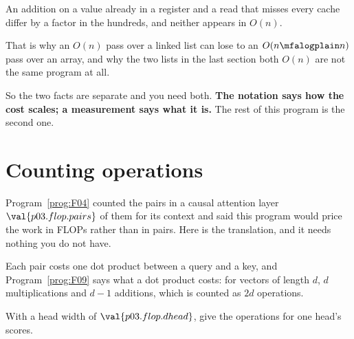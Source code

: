 \begin{fr}

An addition on a value already in a register and a read that misses every
cache differ by a factor in the hundreds, and neither appears in $O(n)$.

That is why an $O(n)$ pass over a linked list can lose to an
$O(n \mfalogplain n)$ pass over an array, and why the two lists in the last
section \dash{} both $O(n)$ \dash{} are not the same program at all.

\medskip
\noindent
So the two facts are separate and you need both. \textbf{The notation says how
the cost scales; a measurement says what it is.} The rest of this program is
the second one.
\end{fr}

\section{Counting operations}
\label{sec:P03-flops}

\begin{fr}
Program~\ref{prog:F04} counted the pairs in a causal attention layer \dash{}
$\val{p03.flop.pairs}$ of them for its context \dash{} and said this program
would price the work in FLOPs rather than in pairs. Here is the translation,
and it needs nothing you do not have.

Each pair costs one dot product between a query and a key, and
Program~\ref{prog:F09} says what a dot product costs: for vectors of length
$d$, $d$ multiplications and $d - 1$ additions, which is counted as $2d$
operations.

With a head width of $\val{p03.flop.dhead}$, give the operations for one head's
scores.
\nextframe
\end{fr}

